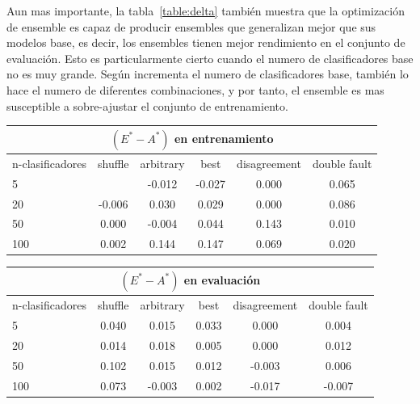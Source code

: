 Aun mas importante, la tabla~\ref{table:delta} también muestra que la optimización de ensemble es capaz de producir ensembles que generalizan mejor que sus modelos base, es decir, los ensembles tienen mejor rendimiento en el conjunto de evaluación.
Esto es particularmente cierto cuando el numero de clasificadores base no es muy grande. Según incrementa el numero de clasificadores base, también lo hace el numero de diferentes combinaciones, y por tanto, el ensemble es mas susceptible a sobre-ajustar el conjunto de entrenamiento.

\begin{table}[H]
    \centering

    \begin{tabular}{lccccc}
    \toprule
        \multicolumn{6}{c}{$(E^* - A^*)$ en entrenamiento} \\ \midrule
        n-clasificadores & shuffle & arbitrary & best & disagreement & double fault  \\ \midrule \midrule
        5  & \cellcolor{red!25}{-0.076}   & \cellcolor{red!25}-0.012   & \cellcolor{red!25}-0.027   & \cellcolor{yellow!25}0.000   & \cellcolor{green!25}0.065 \\
        20 & \cellcolor{red!25}-0.006  & \cellcolor{green!25}0.030  & \cellcolor{green!25}0.029  & \cellcolor{yellow!25}0.000  & \cellcolor{green!25}0.086 \\
        50 & \cellcolor{yellow!25}0.000  & \cellcolor{red!25}-0.004  & \cellcolor{green!25}0.044  & \cellcolor{green!25}0.143  & \cellcolor{green!25}0.010 \\
        100 & \cellcolor{green!25}0.002  & \cellcolor{green!25}0.144  & \cellcolor{green!25}0.147  & \cellcolor{green!25}0.069  & \cellcolor{green!25}0.020 \\
    \bottomrule
    \end{tabular}

    \begin{tabular}{lccccc}
    \toprule
        \multicolumn{6}{c}{$(E^* - A^*)$ en evaluación} \\ \midrule
        n-clasificadores & shuffle & arbitrary & best & disagreement & double fault  \\ \midrule \midrule
        5  & \cellcolor{green!25}0.040   & \cellcolor{green!25}0.015   & \cellcolor{green!25}0.033   & \cellcolor{yellow!25}0.000   & \cellcolor{green!25}0.004 \\
        20 & \cellcolor{green!25}0.014  & \cellcolor{green!25}0.018  & \cellcolor{green!25}0.005  & \cellcolor{yellow!25}0.000  & \cellcolor{green!25}0.012 \\
        50 & \cellcolor{green!25}0.102  & \cellcolor{green!25}0.015  & \cellcolor{green!25}0.012  & \cellcolor{red!25}-0.003  & \cellcolor{green!25}0.006 \\
        100 & \cellcolor{green!25}0.073  & \cellcolor{red!25}-0.003  & \cellcolor{green!25}0.002  & \cellcolor{red!25}-0.017  & \cellcolor{red!25}-0.007 \\
    \bottomrule
    \end{tabular}


\end{table}
